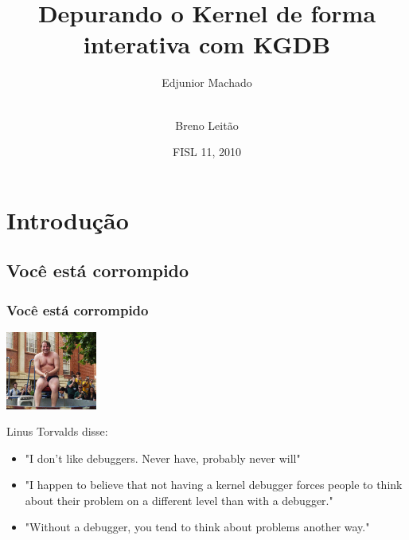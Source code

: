 \documentclass[xcolor=pdftex,dvipsnames,table]{beamer}
\title{Depurando o Kernel de forma interativa com KGDB}
\author{Edjunior Machado \and \\
Breno Leitão }
\date[FISL 11]{FISL 11, 2010}
\begin{document}

\small
{}
\normalsize

\section{Introdução}
\subsection{Você está corrompido}
\begin{frame}
	\frametitle{Você está corrompido}
	\begin{center}
	\includegraphics[width=3cm]{images/linustorvaldsspeedo.jpg}
	\end{center}

	Linus Torvalds disse:
	\begin{itemize}
		\item "I don't like debuggers. Never have, probably never will"
		\item "I happen to believe that not having a kernel debugger forces people to
think about their problem on a different level than with a debugger."
		\item "Without a debugger, you tend to think about problems another way."
	\end{itemize}
\end{frame}
\end{document}
